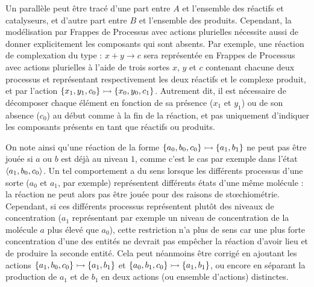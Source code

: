 Un parallèle peut être tracé d'une part entre $A$ et l'ensemble des réactifs et catalyseurs,
et d'autre part entre $B$ et l'ensemble des produits.
Cependant, la modélisation par Frappes de Processus avec actions plurielles
nécessite aussi de donner explicitement les composants qui sont absents.
Par exemple, une réaction de complexation du type : $x + y \rightarrow c$ %
sera représentée en Frappes de Processus avec actions plurielles
à l'aide de trois sortes $x$, $y$ et $c$ contenant chacune deux processus et
représentant respectivement les deux réactifs et le complexe produit,
et par l'action $\mbox{$\{x_1, y_1, c_0\} \rightarrowtail \{x_0, y_0, c_1\}$}$.
Autrement dit, il est nécessaire de décomposer chaque élément en fonction de sa présence
($x_1$ et $y_1$)
ou de son absence ($c_0$) au début comme à la fin de la réaction,
et pas uniquement d'indiquer les composants présents en tant que réactifs ou produits.

On note ainsi qu'une réaction de la forme $\mbox{$\{ a_0, b_0, c_0 \} \rightarrowtail \{ a_1, b_1 \}$}$
ne peut pas être jouée
si $a$ ou $b$ est déjà au niveau $1$,
comme c'est le cas par exemple dans l'état $\mbox{$\langle a_1, b_0, c_0 \rangle$}$.
Un tel comportement a du sens lorsque les différents processus d'une sorte
($a_0$ et $a_1$, par exemple)
représentent différents états d'une même molécule :
la réaction ne peut alors pas être jouée pour des raisons de stœchiométrie.
Cependant, si ces différents processus représentent plutôt des niveaux de concentration
($a_1$ représentant par exemple un niveau de concentration de la molécule $a$ plus élevé que $a_0$),
cette restriction n'a plus de sens car une plus forte concentration d'une des entités
ne devrait pas empêcher la réaction d'avoir lieu et de produire la seconde entité.
Cela peut néanmoins être corrigé en ajoutant les actions
$\mbox{$\{ a_1, b_0, c_0 \} \rightarrowtail \{ a_1, b_1 \}$}$ et
$\mbox{$\{ a_0, b_1, c_0 \} \rightarrowtail \{ a_1, b_1 \}$}$,
ou encore en séparant la production de $a_1$ et de $b_1$ en deux actions (ou ensemble d'actions)
distinctes.

\myskip

